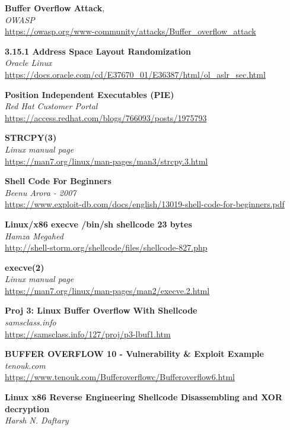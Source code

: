 \documentclass[a4paper,oneside]{article}
\begin{document}
\newpage
\begin{thebibliography}{9}
   
	\textbf{Buffer Overflow Attack}, \\
	\textit{OWASP} \\
	\url{https://owasp.org/www-community/attacks/Buffer_overflow_attack}

	\textbf{3.15.1 Address Space Layout Randomization}\\
	\textit{Oracle Linux}\\
	\url{https://docs.oracle.com/cd/E37670_01/E36387/html/ol_aslr_sec.html}

	\textbf{Position Independent Executables (PIE)}\\
	\textit{Red Hat Customer Portal}\\
	\url{https://access.redhat.com/blogs/766093/posts/1975793}

	\textbf{STRCPY(3)}\\
	\textit{Linux manual page}\\
	\url{https://man7.org/linux/man-pages/man3/strcpy.3.html}
	
	\textbf{Shell Code For Beginners}\\
	\textit{Beenu Arora - 2007}\\
	\url{https://www.exploit-db.com/docs/english/13019-shell-code-for-beginners.pdf}

	\textbf{Linux/x86 execve /bin/sh shellcode 23 bytes}\\
	\textit{Hamza Megahed}\\
	\url{http://shell-storm.org/shellcode/files/shellcode-827.php}
	
	\textbf{execve(2)}\\
	\textit{Linux manual page}\\
	\url{https://man7.org/linux/man-pages/man2/execve.2.html}
	
	\textbf{Proj 3: Linux Buffer Overflow With Shellcode}\\
	\textit{samsclass.info}\\
	\url{https://samsclass.info/127/proj/p3-lbuf1.htm}
	
	\textbf{BUFFER OVERFLOW 10 - Vulnerability \& Exploit Example}\\
	\textit{tenouk.com}\\
	\url{https://www.tenouk.com/Bufferoverflowc/Bufferoverflow6.html}
	
	\textbf{Linux x86 Reverse Engineering
	Shellcode Disassembling and XOR decryption}\\
	\textit{Harsh N. Daftary}
	 
\end{thebibliography}
\end{document}
